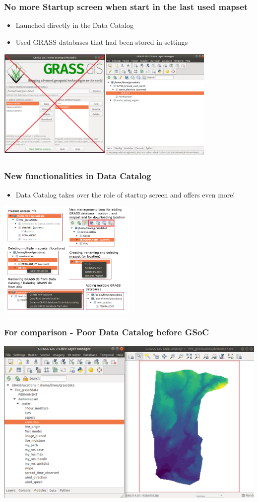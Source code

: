 \documentclass[aspectratio=169]{beamer}
\begin{document}
\begin{frame}
\frametitle{No more Startup screen when start in the last used mapset}
\begin{itemize}
\item Launched directly in the Data Catalog
\item Used GRASS databases that had been stored in settings
\end{itemize}
	\centering
        \includegraphics[width=0.8\textwidth]{pictures/last_mapset_startup.png}
\end{frame}

\begin{frame}
\frametitle{New functionalities in Data Catalog}
\begin{itemize}
\item Data Catalog takes over the role of startup screen and offers even more!
\end{itemize}
	\centering
        \includegraphics[width=0.5\textwidth]{pictures/funkce.PNG}
\end{frame}

\begin{frame}
\frametitle{For comparison - Poor Data Catalog before GSoC}
	        	\centering
	        \includegraphics[width=0.8\columnwidth]{pictures/data_catalog_pred.PNG}
\end{frame}
\end{document}
